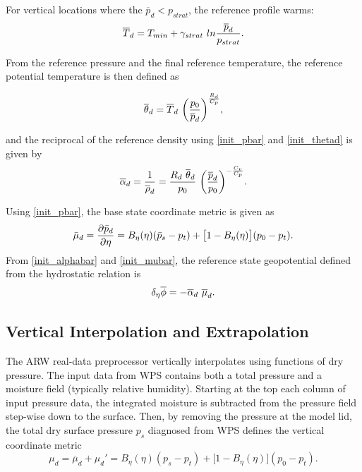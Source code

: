 \noindent For vertical locations where the $\overline{p}_d < p_{strat}$, the reference profile warms:
\begin{equation}
\overline{T}_d = T_{min} + \gamma_{strat}~ln {\overline{p}_d \over p_{strat}}.
\notag
\end{equation}

\noindent From the reference pressure and the final reference temperature, 
the reference potential temperature is then defined as

\noindent
\begin{equation}
\overline{\theta}_d = \overline{T}_d~{\bigg( {p_0 \over \overline{p}_d } \bigg) }
^{R_d \over C_p},
\label{init_thetad}
\end{equation}

\noindent and the reciprocal of the reference density using 
\eqref{init_pbar} and \eqref{init_thetad} is given by
\begin{equation}
\overline{\alpha}_d = {1 \over \overline{\rho}_d} = {{R_d ~\overline{\theta}_d}\over p_{0} }~\bigg( 
{\overline{p}_d \over p_{0} } \bigg)^{-{C_v \over C_p}}.
\label{init_alphabar}
\end{equation}

\noindent Using \eqref{init_pbar}, the base state coordinate metric is given as
%
\begin{equation}
\bar\mu_d= {\partial \bar p_d\over\partial\eta} = B_\eta(\eta)(\bar p_s-p_t)+\bigl[1-B_\eta(\eta)\bigr](p_0-p_t).
\label{init_mubar}
\end{equation}
%
\noindent 
From \eqref{init_alphabar} and \eqref{init_mubar}, 
the reference state geopotential defined from the hydrostatic relation is
\begin{equation}
\delta_{\eta} \overline{\phi}  = -\overline{\alpha}_d~\overline{\mu}_d.
\notag
\end{equation}


\subsection{Vertical Interpolation and Extrapolation}

The ARW real-data preprocessor vertically interpolates using functions of dry pressure.
The input data from WPS contains both a total pressure and a moisture field (typically
relative humidity).  Starting at the top each column of input pressure data, the integrated moisture
is subtracted from the pressure field step-wise down to the surface.  
Then, by removing the pressure at the model
lid, the total dry surface pressure $p_{s}$ diagnosed from WPS defines the vertical coordinate metric
\begin{equation}
\mu_d = \overline{\mu}_d + \mu_d' = B_\eta(\eta)(p_s-p_t)+\bigl[1-B_\eta(\eta)\bigr](p_0-p_t).
\label{init_mutotal}
\end{equation}

